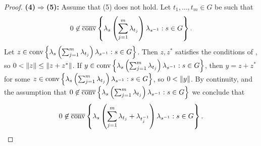 \begin{theorem}
\begin{proof}
\noindent \textbf{(4)$\Rightarrow$(5):} Assume that (5) does not hold. Let $t_1,\dots,t_m \in G$ be such that 
\begin{align*}
0 \not\in \overline{\operatorname{conv}} \left\{ \lambda_s \left( \sum_{j=1}^m \lambda_{t_j} \right)\lambda_{s^{-1}} : s \in G \right\}.
\end{align*}
Let $z \in \operatorname{conv} \left\{ \lambda_s \left( \sum_{j=1}^m \lambda_{t_j} \right)\lambda_{s^{-1}} : s \in G \right\}$.
Then $z,z^*$ satisfies the conditions of , so $0 < \lVert z \rVert \leq \lVert z+z^*\rVert$. If $y \in \operatorname{conv}\left\{ \lambda_s \left( \sum_{j=1}^m \lambda_{t_j} \right)\lambda_{s^{-1}} : s \in G \right\}$, then $y = z + z^*$ for some $z \in \operatorname{conv} \left\{ \lambda_s \left( \sum_{j=1}^m \lambda_{t_j} \right)\lambda_{s^{-1}} : s \in G \right\} $, so $0 < \lVert y \rVert$. By continuity,  and the assumption that $0 \not\in \overline{\operatorname{conv}} \left\{ \lambda_s \left( \sum_{j=1}^m \lambda_{t_j} \right)\lambda_{s^{-1}} : s \in G \right\}$ we conclude that
\begin{align*}
0 \not \in \overline{\operatorname{conv}}\left\{\lambda_s \left(\sum_{j=1}^m \lambda_{t_j}+ \lambda_{t_j^{-1}}\right) \lambda_{s^{-1}} : s \in G\right\}.
\end{align*}
 

\end{proof}
\end{theorem}
